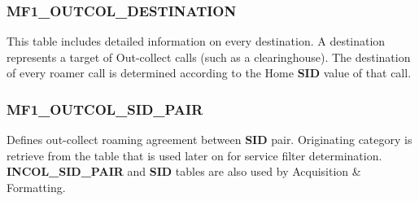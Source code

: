 \documentclass[12pt,twoside]{article}
\begin{document}
\subsubsection{MF1\_OUTCOL\_DESTINATION}
\label{sec:orgheadline102}
This table includes detailed information on every destination.
A destination represents a target of Out-collect calls (such as
a clearinghouse). The destination of every roamer call is
determined according to the Home \textbf{SID} value of that call.

\subsubsection{MF1\_OUTCOL\_SID\_PAIR}
\label{sec:orgheadline103}
Defines out-collect roaming agreement between \textbf{SID} pair.
Originating category is retrieve from the table that is used
later on for service filter determination. \textbf{INCOL\_SID\_PAIR}
and \textbf{SID} tables are also used by Acquisition \& Formatting.
\footnotesize
\end{document}

